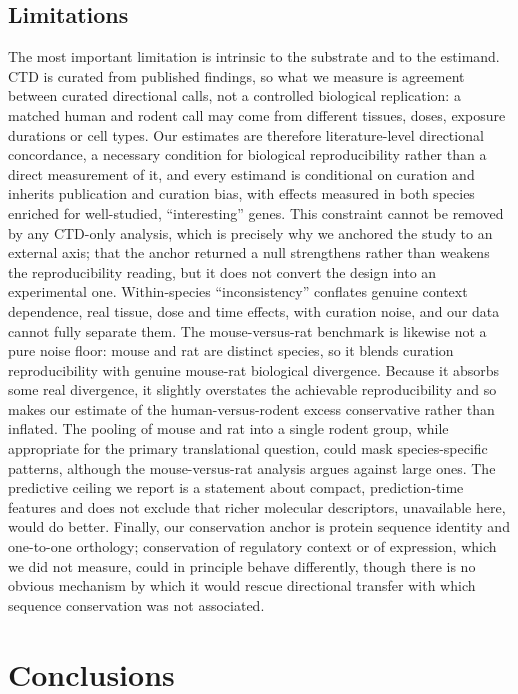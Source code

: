\documentclass[review,12pt,authoryear]{elsarticle}
\begin{document}
\subsection{Limitations}

The most important limitation is intrinsic to the substrate and to the estimand.
CTD is curated from published findings, so what we measure is agreement between
curated directional calls, not a controlled biological replication: a matched
human and rodent call may come from different tissues, doses, exposure durations
or cell types. Our estimates are therefore literature-level directional
concordance, a necessary condition for biological reproducibility rather than a
direct measurement of it, and every estimand is conditional on curation and
inherits publication and curation bias, with effects measured in both species
enriched for well-studied, ``interesting'' genes. This constraint cannot be
removed by any CTD-only analysis, which is precisely why we anchored the study to
an external axis; that the anchor returned a null strengthens rather than weakens
the reproducibility reading, but it does not convert the design into an
experimental one. Within-species ``inconsistency'' conflates genuine context
dependence, real tissue, dose and time effects, with curation noise, and our data
cannot fully separate them. The mouse-versus-rat benchmark is likewise not a pure
noise floor: mouse and rat are distinct species, so it blends curation
reproducibility with genuine mouse-rat biological divergence. Because it absorbs
some real divergence, it slightly overstates the achievable reproducibility and
so makes our estimate of the human-versus-rodent excess conservative rather than
inflated. The pooling of mouse and rat into a single rodent group, while
appropriate for the primary translational question, could mask species-specific
patterns, although the mouse-versus-rat analysis argues against large ones. The
predictive ceiling we report is a statement about compact, prediction-time
features and does not exclude that richer molecular descriptors, unavailable
here, would do better. Finally, our conservation anchor is protein sequence
identity and one-to-one orthology; conservation of regulatory context or of
expression, which we did not measure, could in principle behave differently,
though there is no obvious mechanism by which it would rescue directional
transfer with which sequence conservation was not associated.

\section{Conclusions}
\end{document}
